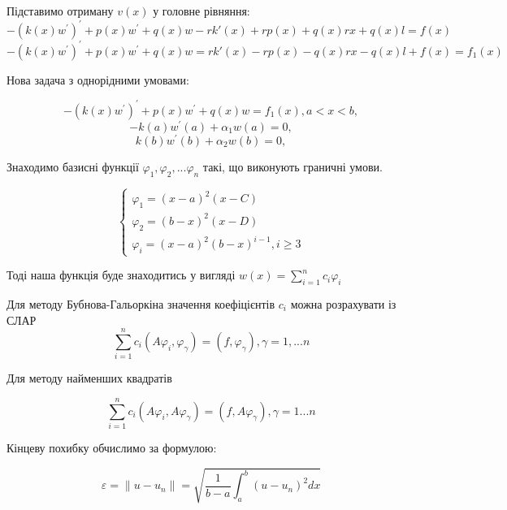 Підставимо отриману $v(x)$ у головне рівняння:
$$-(k(x) w^{\prime})^{\prime}+p(x) w^{\prime}+q(x) w - rk'(x) + rp(x) + q(x)rx + q(x)l = f(x)$$
$$-(k(x) w^{\prime})^{\prime}+p(x) w^{\prime}+q(x) w = rk'(x) - rp(x) - q(x)rx - q(x)l + f(x) = f_1(x)$$


Нова задача з однорідними умовами:


$$-(k(x) w^{\prime})^{\prime}+p(x) w^{\prime}+q(x) w=f_1(x), a<x<b,$$ 
$$-k(a) w^{\prime}(a)+\alpha_1 w(a)=0,$$
$$ k(b) w^{\prime}(b)+\alpha_2 w(b)=0,$$


Знаходимо базисні функції $\varphi_1, \varphi_2, ... \varphi_n$ такі, що виконують граничні умови.


$$
\begin{cases}
    \varphi_1 = (x - a)^2 (x - C) \\ 
    \varphi_2 = (b - x)^2 (x - D) \\
    \varphi_i = (x - a)^2 (b - x)^{i-1}, i \geq 3 
\end{cases} 
$$


Тоді наша функція буде знаходитись у вигляді $w(x) = \sum\limits_{i=1}^{n} c_i \varphi_i $
\pagebreak

Для методу Бубнова-Гальоркіна значення коефіцієнтів $c_i$ можна розрахувати із СЛАР
$$\sum_{i=1}^{n} c_i (A\varphi_i, \varphi_\gamma) = (f, \varphi_\gamma), \gamma = 1, ... n$$


Для методу найменших квадратів 


$$ \sum_{i=1}^{n} c_i (A\varphi_i, A\varphi_\gamma) = (f, A\varphi_\gamma), \gamma = 1...n $$


Кінцеву похибку обчислимо за формулою:


$$\varepsilon = \| u - u_n \| = \sqrt{\frac{1}{b-a} \int_{a}^{b} (u - u_n)^2dx}$$
